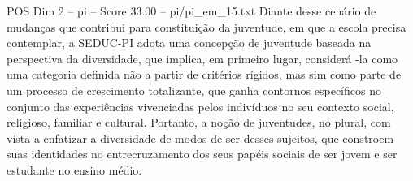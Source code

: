 \begin{textsample}{POS Dim 2 – pi – Score 33.00 – pi/pi\_em\_15.txt}
Diante desse cenário de mudanças que contribui para constituição da juventude, em que a escola precisa contemplar, a SEDUC-PI adota uma concepção de juventude baseada na perspectiva da diversidade, que implica, em primeiro lugar, considerá -la como uma categoria definida não a partir de critérios rígidos, mas sim como parte de um processo de crescimento totalizante, que ganha contornos específicos no conjunto das experiências vivenciadas pelos indivíduos no seu contexto social, religioso, familiar e cultural.
Portanto, a noção de juventudes, no plural, com vista a enfatizar a diversidade de modos de ser desses sujeitos, que constroem suas identidades no entrecruzamento dos seus papéis sociais de ser jovem e ser estudante no ensino médio.

\end{textsample}
